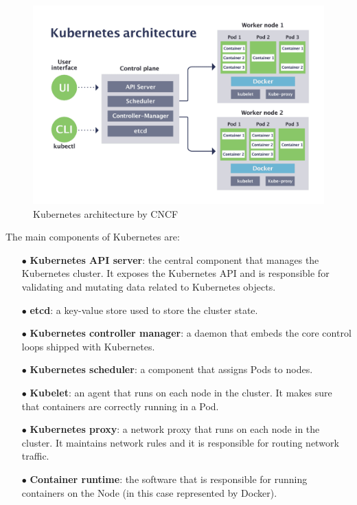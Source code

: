\begin{figure}[htb]
    \centering
    \includegraphics[width=1\linewidth]{images/kubernetes-architecture-diagram.png}
    \caption{Kubernetes architecture by CNCF \cite{kubernetes_cnfc}}
    \label{fig:kubernetes_architecture}
\end{figure}

The main components of Kubernetes are:
\begin{itemize}[itemsep=0.2pt, topsep=1pt]
    \item[$\bullet$] \textbf{Kubernetes API server}: the central component that manages the Kubernetes cluster. It exposes the Kubernetes API and is responsible for validating and mutating data related to Kubernetes objects.
    \item[$\bullet$] \textbf{etcd}: a key-value store used to store the cluster state.
    \item[$\bullet$] \textbf{Kubernetes controller manager}: a daemon that embeds the core control loops shipped with Kubernetes.
    \item[$\bullet$] \textbf{Kubernetes scheduler}: a component that assigns Pods to nodes.
    \item[$\bullet$] \textbf{Kubelet}: an agent that runs on each node in the cluster. It makes sure that containers are correctly running in a Pod.
    \item[$\bullet$] \textbf{Kubernetes proxy}: a network proxy that runs on each node in the cluster. It maintains network rules and it is responsible for routing network traffic.
    \item[$\bullet$] \textbf{Container runtime}: the software that is responsible for running containers on the Node (in this case represented by Docker).
\end{itemize}


